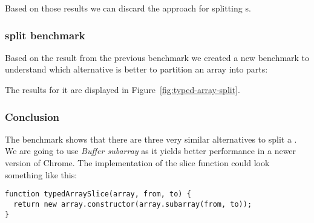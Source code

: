 Based on those results we can discard the  approach for splitting \ttarray{}s.


\subsubsection{\ttarray{} split benchmark}
Based on the result from the previous benchmark we created a new benchmark to understand which alternative is better to partition an array into parts:

The results for it are displayed in Figure~\ref{fig:typed-array-split}.

\subsubsection{Conclusion}
The benchmark shows that there are three very similar alternatives to split a \ttarray{}. We are going to use \textit{Buffer subarray} as it yields better performance in a newer version of Chrome. The implementation of the slice function could look something like this:
\begin{lstlisting}[caption=Function to benchmark]
function typedArraySlice(array, from, to) {
  return new array.constructor(array.subarray(from, to));
}
\end{lstlisting}

\pagebreak